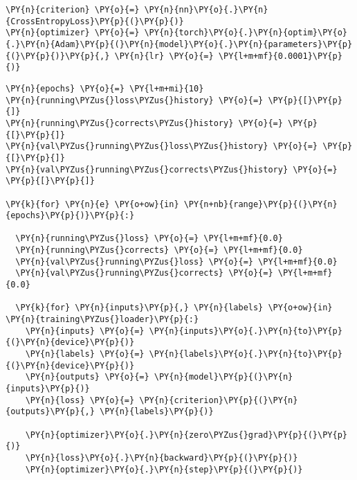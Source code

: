     \begin{tcolorbox}[breakable, size=fbox, boxrule=1pt, pad at break*=1mm,colback=cellbackground, colframe=cellborder]
\begin{Verbatim}[commandchars=\\\{\}]
\PY{n}{criterion} \PY{o}{=} \PY{n}{nn}\PY{o}{.}\PY{n}{CrossEntropyLoss}\PY{p}{(}\PY{p}{)}
\PY{n}{optimizer} \PY{o}{=} \PY{n}{torch}\PY{o}{.}\PY{n}{optim}\PY{o}{.}\PY{n}{Adam}\PY{p}{(}\PY{n}{model}\PY{o}{.}\PY{n}{parameters}\PY{p}{(}\PY{p}{)}\PY{p}{,} \PY{n}{lr} \PY{o}{=} \PY{l+m+mf}{0.0001}\PY{p}{)}
\end{Verbatim}
\end{tcolorbox}

    \begin{tcolorbox}[breakable, size=fbox, boxrule=1pt, pad at break*=1mm,colback=cellbackground, colframe=cellborder]
\begin{Verbatim}[commandchars=\\\{\}]
\PY{n}{epochs} \PY{o}{=} \PY{l+m+mi}{10}
\PY{n}{running\PYZus{}loss\PYZus{}history} \PY{o}{=} \PY{p}{[}\PY{p}{]}
\PY{n}{running\PYZus{}corrects\PYZus{}history} \PY{o}{=} \PY{p}{[}\PY{p}{]}
\PY{n}{val\PYZus{}running\PYZus{}loss\PYZus{}history} \PY{o}{=} \PY{p}{[}\PY{p}{]}
\PY{n}{val\PYZus{}running\PYZus{}corrects\PYZus{}history} \PY{o}{=} \PY{p}{[}\PY{p}{]}

\PY{k}{for} \PY{n}{e} \PY{o+ow}{in} \PY{n+nb}{range}\PY{p}{(}\PY{n}{epochs}\PY{p}{)}\PY{p}{:}
  
  \PY{n}{running\PYZus{}loss} \PY{o}{=} \PY{l+m+mf}{0.0}
  \PY{n}{running\PYZus{}corrects} \PY{o}{=} \PY{l+m+mf}{0.0}
  \PY{n}{val\PYZus{}running\PYZus{}loss} \PY{o}{=} \PY{l+m+mf}{0.0}
  \PY{n}{val\PYZus{}running\PYZus{}corrects} \PY{o}{=} \PY{l+m+mf}{0.0}
  
  \PY{k}{for} \PY{n}{inputs}\PY{p}{,} \PY{n}{labels} \PY{o+ow}{in} \PY{n}{training\PYZus{}loader}\PY{p}{:}
    \PY{n}{inputs} \PY{o}{=} \PY{n}{inputs}\PY{o}{.}\PY{n}{to}\PY{p}{(}\PY{n}{device}\PY{p}{)}
    \PY{n}{labels} \PY{o}{=} \PY{n}{labels}\PY{o}{.}\PY{n}{to}\PY{p}{(}\PY{n}{device}\PY{p}{)}
    \PY{n}{outputs} \PY{o}{=} \PY{n}{model}\PY{p}{(}\PY{n}{inputs}\PY{p}{)}
    \PY{n}{loss} \PY{o}{=} \PY{n}{criterion}\PY{p}{(}\PY{n}{outputs}\PY{p}{,} \PY{n}{labels}\PY{p}{)}
    
    \PY{n}{optimizer}\PY{o}{.}\PY{n}{zero\PYZus{}grad}\PY{p}{(}\PY{p}{)}
    \PY{n}{loss}\PY{o}{.}\PY{n}{backward}\PY{p}{(}\PY{p}{)}
    \PY{n}{optimizer}\PY{o}{.}\PY{n}{step}\PY{p}{(}\PY{p}{)}
    

\end{Verbatim}
\end{tcolorbox}
